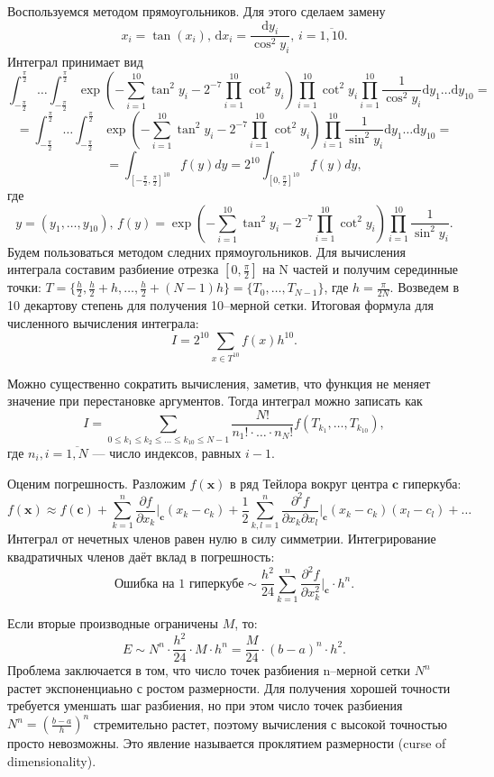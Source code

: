 \documentclass{article}
\renewcommand{\le}{\leqslant}
\theoremstyle{definition}
\begin{document}
Воспользуемся методом прямоугольников. Для этого сделаем замену
$$
    x_i = \tan(x_i),\, \mathrm dx_i = \frac{\mathrm dy_i}{\cos^2y_i},\, i = \overline{1, 10}.
$$
Интеграл принимает вид
$$
    \int_{-\frac{\pi}{2}}^{\frac{\pi}{2}} \dots \int_{-\frac{\pi}{2}}^{\frac{\pi}{2}} \exp\left(-\sum_{i = 1}^{10} \tan^2 y_i - 2^{-7}\prod_{i = 1}^{10}\cot^2 y_i\right)\prod_{i = 1}^{10}\cot^2 y_i\prod_{i = 1}^{10}\frac{1}{\cos^2 y_i} \mathrm dy_1 \dots \mathrm dy_{10} =
$$
$$
     = \int_{-\frac{\pi}{2}}^{\frac{\pi}{2}} \dots \int_{-\frac{\pi}{2}}^{\frac{\pi}{2}} \exp\left(-\sum_{i = 1}^{10} \tan^2 y_i - 2^{-7}\prod_{i = 1}^{10}\cot^2 y_i\right)\prod_{i = 1}^{10}\frac{1}{\sin^2 y_i} \mathrm dy_1 \dots \mathrm dy_{10} =
$$
$$
    = \int_{[-\frac{\pi}{2}, \frac{\pi}{2}]^{10}}f(y)dy = 2^{10}\int_{[0, \frac{\pi}{2}]^{10}}f(y)dy,
$$
где
$$
    y = (y_1, \dots, y_{10}),\, f(y) = \exp\left(-\sum_{i = 1}^{10} \tan^2 y_i - 2^{-7}\prod_{i = 1}^{10}\cot^2 y_i\right)\prod_{i = 1}^{10}\frac{1}{\sin^2 y_i}.
$$
Будем пользоваться методом следних прямоугольников. Для вычисления интеграла составим разбиение отрезка $[0, \frac{\pi}{2}]$ на N частей и получим серединные точки: $T = \{\frac{h}{2}, \frac{h}{2} + h, \dots, \frac{h}{2} + (N-1)h\} = \{T_0, \dots, T_{N-1}\}$, где $h = \frac{\pi}{2 N}$. Возведем в 10 декартову степень для получения 10--мерной сетки. Итоговая формула для численного вычисления интеграла:
$$
    I = 2^{10}\sum_{x \in T^{10}}f(x)h^{10}.
$$

Можно существенно сократить вычисления, заметив, что функция не меняет значение при перестановке аргументов. Тогда интеграл можно записать как
$$
    I = \sum_{0 \le k_1 \le k_2 \le \dots \le k_{10} \le N-1} \frac{N!}{n_1!\cdot \dots \cdot n_{N}!} f(T_{k_1}, \dots, T_{k_{10}}),
$$
где $n_i, i = \overline{1, N}$ --- число индексов, равных $i - 1$.

Оценим погрешность. Разложим $f(\mathbf{x})$ в ряд Тейлора вокруг центра $\mathbf{c}$ гиперкуба:
$$
f(\mathbf{x}) \approx f(\mathbf{c}) + \sum_{k=1}^n \frac{\partial f}{\partial x_k} \bigg|_{\mathbf{c}} (x_k - c_k) + \frac{1}{2} \sum_{k,l=1}^n \frac{\partial^2 f}{\partial x_k \partial x_l} \bigg|_{\mathbf{c}} (x_k - c_k)(x_l - c_l) + \dots
$$
Интеграл от нечетных членов равен нулю в силу симметрии. Интегрирование квадратичных членов даёт вклад в погрешность:
$$
\text{Ошибка на 1 гиперкубе} \sim \frac{h^2}{24} \sum_{k=1}^n \frac{\partial^2 f}{\partial x_k^2} \bigg|_{\mathbf{c}} \cdot h^n.
$$

Если вторые производные ограничены $M$, то:
$$
E \sim N^n \cdot \frac{h^2}{24} \cdot M \cdot h^n = \frac{M}{24} \cdot (b-a)^n \cdot h^2.
$$
Проблема заключается в том, что число точек разбиения n--мерной сетки $N^n$ растет экспоненциаьно с ростом размерности. Для получения хорошей точности требуется уменшать шаг разбиения, но при этом число точек разбиения $N^n = \left(\frac{b - a}{h}\right)^n$ стремительно растет, поэтому вычисления с высокой точностью просто невозможны. Это явление называется проклятием размерности (curse of dimensionality).
\end{document}
